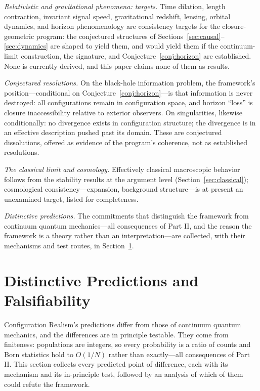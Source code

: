 \documentclass[11pt]{article}
\theoremstyle{definition}
\theoremstyle{remark}
\begin{document}
\emph{Relativistic and gravitational phenomena: targets.} Time dilation, length contraction, invariant signal speed, gravitational redshift, lensing, orbital dynamics, and horizon phenomenology are consistency targets for the closure-geometric program: the conjectured structures of Sections~\ref{sec:causal}--\ref{sec:dynamics} are shaped to yield them, and would yield them if the continuum-limit construction, the signature, and Conjecture~\ref{conj:horizon} are established. None is currently derived, and this paper claims none of them as results.

\emph{Conjectured resolutions.} On the black-hole information problem, the framework's position---conditional on Conjecture~\ref{conj:horizon}---is that information is never destroyed: all configurations remain in configuration space, and horizon ``loss'' is closure inaccessibility relative to exterior observers. On singularities, likewise conditionally: no divergence exists in configuration structure; the divergence is in an effective description pushed past its domain. These are conjectured dissolutions, offered as evidence of the program's coherence, not as established resolutions.

\emph{The classical limit and cosmology.} Effectively classical macroscopic behavior follows from the stability results at the argument level (Section~\ref{sec:classical}); cosmological consistency---expansion, background structure---is at present an unexamined target, listed for completeness.

\emph{Distinctive predictions.} The commitments that distinguish the framework from continuum quantum mechanics---all consequences of Part II, and the reason the framework is a theory rather than an interpretation---are collected, with their mechanisms and test routes, in Section~\ref{sec:predictions}.

\section{Distinctive Predictions and Falsifiability}\label{sec:predictions}
Configuration Realism's predictions differ from those of continuum quantum mechanics, and the differences are in principle testable. They come from finiteness: populations are integers, so every probability is a ratio of counts and Born statistics hold to $O(1/N)$ rather than exactly---all consequences of Part II. This section collects every predicted point of difference, each with its mechanism and its in-principle test, followed by an analysis of which of them could refute the framework.
\end{document}
